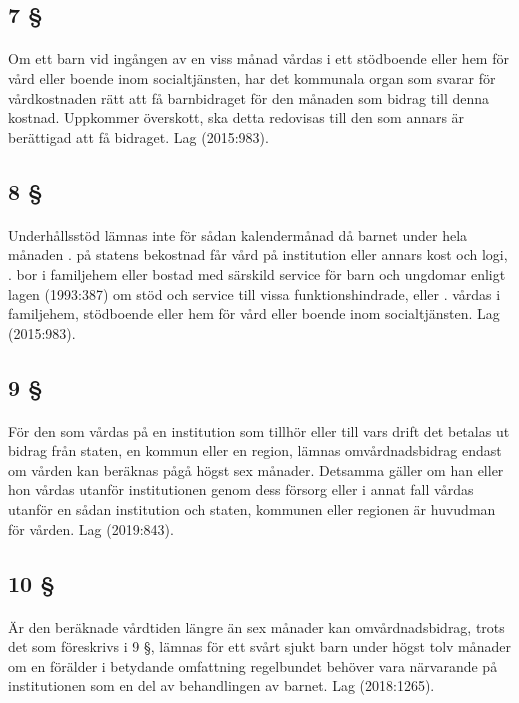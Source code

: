 \documentclass[a4paper,notitlepage,openany,10pt]{book}
\begin{document}
\subsection*{7 §}
\paragraph*{}
Om ett barn vid ingången av en viss månad vårdas i ett stödboende eller hem för vård eller boende inom socialtjänsten, har det kommunala organ som svarar för vårdkostnaden rätt att få barnbidraget för den månaden som bidrag till denna kostnad. Uppkommer överskott, ska detta redovisas till den som annars är berättigad att få bidraget.
Lag (2015:983).
\subsection*{8 §}
\paragraph*{}
Underhållsstöd lämnas inte för sådan kalendermånad då barnet under hela månaden
. på statens bekostnad får vård på institution eller annars kost och logi,
. bor i familjehem eller bostad med särskild service för barn och ungdomar enligt lagen (1993:387) om stöd och service till vissa funktionshindrade, eller
. vårdas i familjehem, stödboende eller hem för vård eller boende inom socialtjänsten.
Lag (2015:983).
\subsection*{9 §}
\paragraph*{}
För den som vårdas på en institution som tillhör eller till vars drift det betalas ut bidrag från staten, en kommun eller en region, lämnas omvårdnadsbidrag endast om vården kan beräknas pågå högst sex månader. Detsamma gäller om han eller hon vårdas utanför institutionen genom dess försorg eller i annat fall vårdas utanför en sådan institution och staten, kommunen eller regionen är huvudman för vården.
Lag (2019:843).
\subsection*{10 §}
\paragraph*{}
Är den beräknade vårdtiden längre än sex månader kan omvårdnadsbidrag, trots det som föreskrivs i 9 §, lämnas för ett svårt sjukt barn under högst tolv månader om en förälder i betydande omfattning regelbundet behöver vara närvarande på institutionen som en del av behandlingen av barnet.
Lag (2018:1265).
\end{document}

